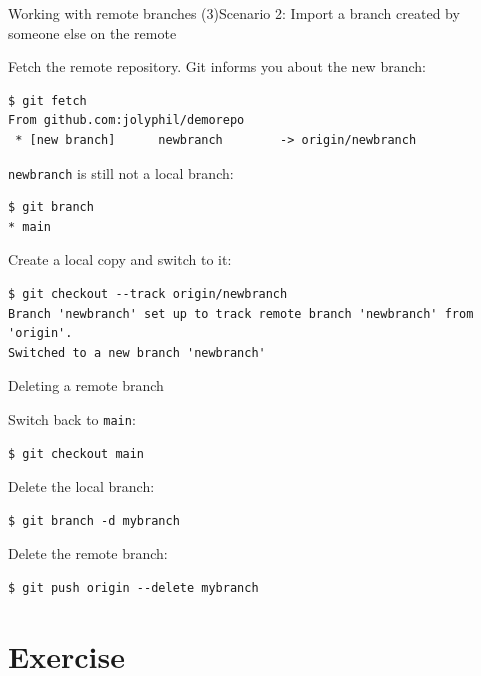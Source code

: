 \documentclass[handout]{beamer}
\begin{document}
\begin{frame}[fragile]{Working with remote branches (3)}{Scenario 2: Import a branch created by someone else on the remote}

Fetch the remote repository. Git informs you about the new branch: 

\begin{lstlisting}
$ git fetch
From github.com:jolyphil/demorepo
 * [new branch]      newbranch        -> origin/newbranch

\end{lstlisting}

\texttt{newbranch} is still not a local branch:

\begin{lstlisting}
$ git branch
* main
\end{lstlisting}

Create a local copy and switch to it: 

\begin{lstlisting}
$ git checkout --track origin/newbranch
Branch 'newbranch' set up to track remote branch 'newbranch' from 'origin'.
Switched to a new branch 'newbranch'
\end{lstlisting}

\end{frame}

\begin{frame}[fragile]{Deleting a remote branch}

Switch back to \texttt{main}:

\begin{lstlisting}
$ git checkout main
\end{lstlisting}

Delete the local branch:

\begin{lstlisting}
$ git branch -d mybranch
\end{lstlisting}

Delete the remote branch:

\begin{lstlisting}
$ git push origin --delete mybranch
\end{lstlisting}

\end{frame}


\section{Exercise}
\end{document}
